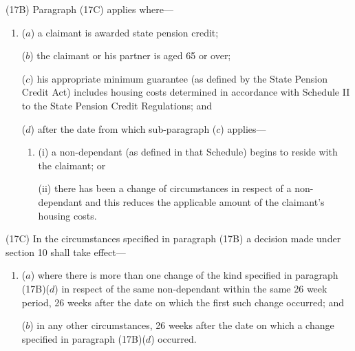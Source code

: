 \documentclass[12pt,a4paper]{article}
\begin{document}
%
%

(17B) Paragraph (17C) applies where—
\begin{enumerate}\item[]
($a$) a claimant is awarded state pension credit;

($b$) the claimant or his partner is aged 65 or over;

($c$) his appropriate minimum guarantee (as defined by the State Pension Credit Act) includes housing costs determined in accordance with Schedule II to the State Pension Credit Regulations; and

($d$) after the date from which sub-paragraph ($c$)  applies—
\begin{enumerate}\item[]
(i) a non-dependant (as defined in that Schedule) begins to reside with the claimant; or

(ii) 
there has been a change of circumstances in respect of a non-dependant and this reduces  %
the applicable amount of the claimant’s housing costs.
\end{enumerate}
\end{enumerate}

(17C) In the circumstances specified in paragraph (17B) a decision made under section 10 shall take effect—
\begin{enumerate}\item[]
($a$) where there is more than one change of the kind specified in paragraph (17B)($d$)  in respect of the same non-dependant within the same 26 week period, 26 weeks after the date on which the first such change occurred; and

($b$) in any other circumstances, 26 weeks after the date on which a change specified in paragraph (17B)($d$)  occurred.
\end{enumerate}
\end{document}
